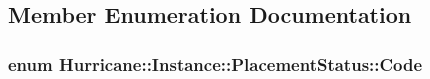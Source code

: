 \subsection{Member Enumeration Documentation}
\hypertarget{classHurricane_1_1Instance_1_1PlacementStatus_af76cc0838783b3eb3a515eb3c3e0f7bf}{
\subsubsection[{Code}]{\setlength{\rightskip}{0pt plus 5cm}enum {\bf Hurricane\-::\-Instance\-::\-Placement\-Status\-::\-Code}}}\label{classHurricane_1_1Instance_1_1PlacementStatus_af76cc0838783b3eb3a515eb3c3e0f7bf}

